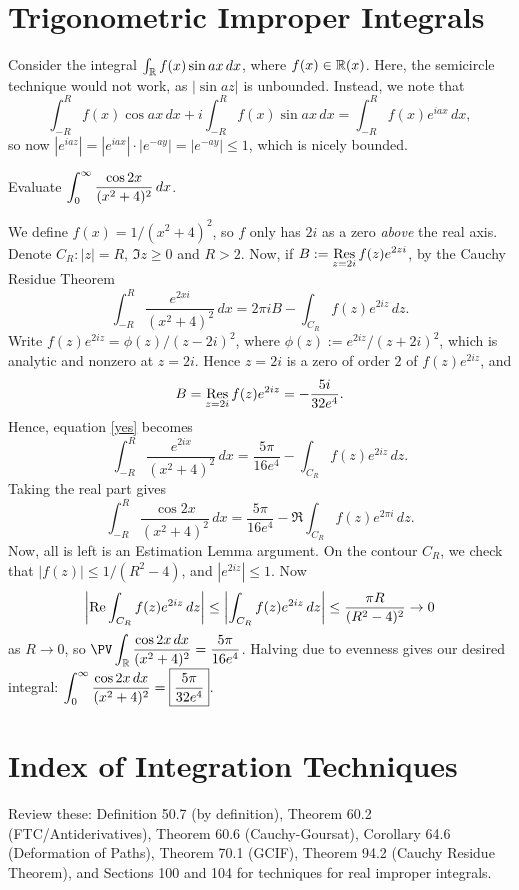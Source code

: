 \documentclass{article}
\begin{document}
\section{Trigonometric Improper Integrals}
Consider the integral $\int_\mathbb R f(x) \sin ax\, dx$, where $f(x) \in \mathbb R(x)$. Here, the semicircle technique would not work, as $|\sin az|$ is unbounded. Instead, we note that \newpage
$$\int_{-R}^R f(x) \cos ax \, dx + i\int_{-R}^R f(x)\sin ax \, dx = \int_{-R}^R f(x) e^{iax}\, dx,$$
so now $|e^{iaz}| = |e^{iax}|\cdot |e^{-ay}| = |e^{-ay}| \leq 1$, which is nicely bounded.
\begin{example}
Evaluate $\displaystyle\int_0^\infty \frac{\cos 2x}{(x^2+4)^2} \, dx$.
\end{example}
\begin{solution}
We define $f(x) = 1/(x^2+4)^2$, so $f$ only has $2i$ as a zero \textit{above} the real axis. Denote $C_R: |z|=R$, $\Im z \geq 0$ and $R>2$. Now, if $B := \displaystyle\operatorname*{Res}_{z=2i} f(z)e^{2zi}$, by the Cauchy Residue Theorem
\begin{equation}\label{yes}
\int_{-R}^R \frac{e^{2xi}}{(x^2+4)^2}\, dx = 2\pi i B -\int_{C_R} f(z) e^{2iz}\, dz.
\end{equation}
Write $f(z)e^{2iz} = \phi(z)/(z-2i)^2$, where $\phi(z) := e^{2iz}/(z+2i)^2$, which is analytic and nonzero at $z=2i$. Hence $z=2i$ is a zero of order $2$ of $f(z)e^{2iz}$, and
$$B = \operatorname*{Res}_{z=2i} f(z)e^{2iz} = -\frac {5i}{32e^4}.$$
Hence, equation \ref{yes} becomes
$$\int_{-R}^R \frac{e^{2ix}}{(x^2+4)^2}\, dx = \frac {5\pi}{16e^4} - \int_{C_R} f(z) e^{2iz}\, dz.$$
Taking the real part gives
$$\int_{-R}^R \frac{\cos 2x}{(x^2+4)^2} \, dx = \frac{5\pi}{16e^4} - \Re\int_{C_R} f(z)e^{2\pi i}\, dz.$$
Now, all is left is an Estimation Lemma argument. On the contour $C_R$, we check that $|f(z)| \leq 1/(R^2-4)$, and $|e^{2iz}| \leq 1$. Now
$$\left|\operatorname{Re}\int_{C_R} f(z) e^{2iz}\, dz\right| \leq \left|\int_{C_R} f(z)e^{2iz} \, dz\right| \leq \frac{\pi R}{(R^2-4)^2} \to 0$$
as $R\to 0$, so $\PV\ds\int_\R \frac{\cos 2x\, dx}{ (x^2+4)^2} = \frac{5\pi}{16e^4}$. Halving due to evenness gives our desired integral: $\displaystyle\int_0^\infty \frac{\cos 2x\, dx}{(x^2+4)^2} = \boxed{\frac{5\pi}{32e^4}}$.
\end{solution}
\setcounter{section}{106}
\section{Index of Integration Techniques}
Review these: Definition 50.7 (by definition), Theorem 60.2 (FTC/Antiderivatives), Theorem 60.6 (Cauchy-Goursat), Corollary 64.6 (Deformation of Paths), Theorem 70.1 (GCIF), Theorem 94.2 (Cauchy Residue Theorem), and Sections 100 and 104 for techniques for real improper integrals.
\end{document}
